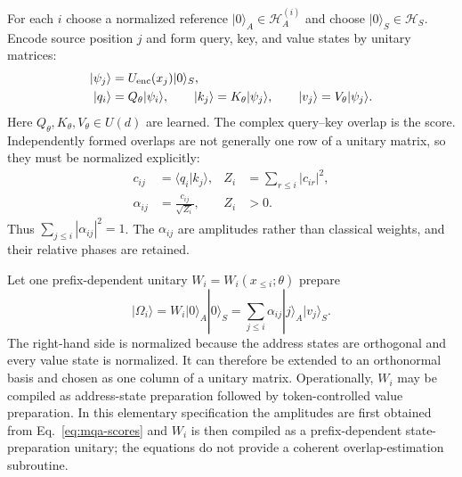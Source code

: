\documentclass[
  aps,
  reprint,
  superscriptaddress,
  floatfix,
  nofootinbib,
  longbibliography
]{revtex4-2}
\begin{document}
For each $i$ choose a normalized reference $|0\rangle_A\in\mathcal H_A^{(i)}$
and choose $|0\rangle_S\in\mathcal H_S$.  Encode source position $j$ and form
query, key, and value states by unitary matrices:
\begin{equation}
\begin{aligned}
 |\psi_j\rangle&=U_{\rm enc}(x_j)|0\rangle_S,\\
 |q_i\rangle&=Q_\theta|\psi_i\rangle,\qquad
 |k_j\rangle=K_\theta|\psi_j\rangle,\qquad
 |v_j\rangle=V_\theta|\psi_j\rangle .
\end{aligned}
\label{eq:mqa-encoding}
\end{equation}
Here $Q_\theta,K_\theta,V_\theta\in U(d)$ are learned.  The complex
query--key overlap is the score.  Independently formed overlaps are not
generally one row of a unitary matrix, so they must be normalized explicitly:
\begin{equation}
\begin{aligned}
 c_{ij}&=\langle q_i|k_j\rangle,
 &Z_i&=\sum_{r\leq i}|c_{ir}|^2,\\
 \alpha_{ij}&=\frac{c_{ij}}{\sqrt{Z_i}},
 &Z_i&>0 .
\end{aligned}
\label{eq:mqa-scores}
\end{equation}
Thus $\sum_{j\leq i}|\alpha_{ij}|^2=1$.  The $\alpha_{ij}$ are amplitudes
rather than classical weights, and their relative phases are retained.

Let one prefix-dependent unitary $W_i=W_i(x_{\leq i};\theta)$ prepare
\begin{equation}
 |\Omega_i\rangle
 =W_i|0\rangle_A|0\rangle_S
 =\sum_{j\leq i}\alpha_{ij}|j\rangle_A|v_j\rangle_S .
\label{eq:mqa-unitary}
\end{equation}
The right-hand side is normalized because the address states are orthogonal
and every value state is normalized.  It can therefore be extended to an
orthonormal basis and chosen as one column of a unitary matrix.
Operationally, $W_i$ may be compiled as address-state preparation followed by
token-controlled value preparation.  In this elementary specification the
amplitudes are first obtained from Eq.~\eqref{eq:mqa-scores} and $W_i$ is then
compiled as a prefix-dependent state-preparation unitary; the equations do not
provide a coherent overlap-estimation subroutine.
\end{document}
